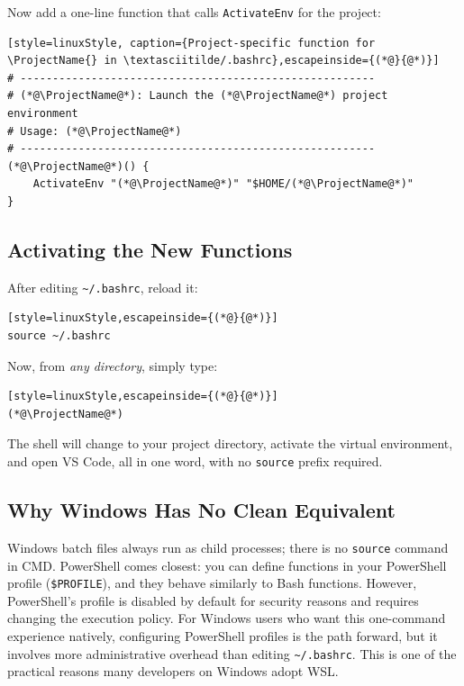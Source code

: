 Now add a one-line function that calls \texttt{ActivateEnv} for the
\ProjectName{} project:

\begin{lstlisting}[style=linuxStyle, caption={Project-specific function for \ProjectName{} in \textasciitilde/.bashrc},escapeinside={(*@}{@*)}]
# -------------------------------------------------------
# (*@\ProjectName@*): Launch the (*@\ProjectName@*) project environment
# Usage: (*@\ProjectName@*)
# -------------------------------------------------------
(*@\ProjectName@*)() {
    ActivateEnv "(*@\ProjectName@*)" "$HOME/(*@\ProjectName@*)"
}
\end{lstlisting}

\subsection{Activating the New Functions}

After editing \texttt{\textasciitilde/.bashrc}, reload it:

\begin{lstlisting}[style=linuxStyle,escapeinside={(*@}{@*)}]
source ~/.bashrc
\end{lstlisting}

Now, from \emph{any directory}, simply type:

\begin{lstlisting}[style=linuxStyle,escapeinside={(*@}{@*)}]
(*@\ProjectName@*)
\end{lstlisting}

The shell will change to your \ProjectName{} project directory, activate the
virtual environment, and open VS Code, all in one word, with no
\texttt{source} prefix required.

\subsection{Why Windows Has No Clean Equivalent}

Windows batch files always run as child processes; there is no
\texttt{source} command in CMD. PowerShell comes closest: you can define
functions in your PowerShell profile (\texttt{\$PROFILE}), and they
behave similarly to Bash functions. However, PowerShell's profile is
disabled by default for security reasons and requires changing the
execution policy. For Windows users who want this one-command experience
natively, configuring PowerShell profiles is the path forward, but it
involves more administrative overhead than editing
\texttt{\textasciitilde/.bashrc}. This is one of the practical reasons
many developers on Windows adopt WSL.

